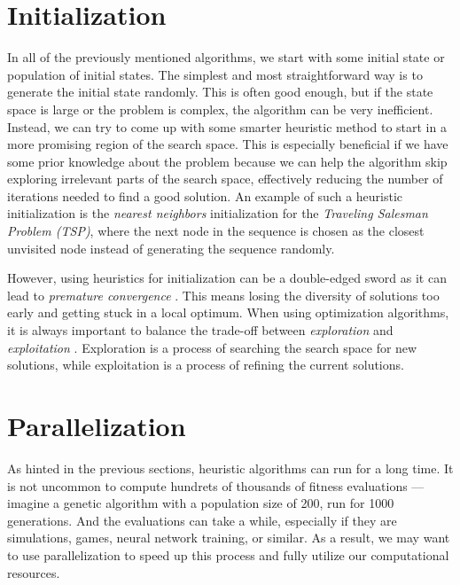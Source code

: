 \section{Initialization} \label{sec:initialization}

In all of the previously mentioned algorithms, we start with some initial state or population of initial states. The simplest and most straightforward way is to generate the initial state randomly. This is often good enough, but if the state space is large or the problem is complex, the algorithm can be very inefficient. Instead, we can try to come up with some smarter heuristic method to start in a more promising region of the search space. This is especially beneficial if we have some prior knowledge about the problem because we can help the algorithm skip exploring irrelevant parts of the search space, effectively reducing the number of iterations needed to find a good solution. An example of such a heuristic initialization is the \textit{nearest neighbors} initialization for the \textit{Traveling Salesman Problem (TSP)}, where the next node in the sequence is chosen as the closest unvisited node instead of generating the sequence randomly.

However, using heuristics for initialization can be a double-edged sword as it can lead to \textit{premature convergence} \cite{vanneschi2023lectures}. This means losing the diversity of solutions too early and getting stuck in a local optimum.
When using optimization algorithms, it is always important to balance the trade-off between \textit{exploration} and \textit{exploitation} \cite{luke2013essentials}. Exploration is a process of searching the search space for new solutions, while exploitation is a process of refining the current solutions.

\section{Parallelization} \label{sec:parallelization}

As hinted in the previous sections, heuristic algorithms can run for a long time. It is not uncommon to compute hundrets of thousands of fitness evaluations --- imagine a genetic algorithm with a population size of 200, run for 1000 generations. And the evaluations can take a while, especially if they are simulations, games, neural network training, or similar. As a result, we may want to use parallelization to speed up this process and fully utilize our computational resources.

